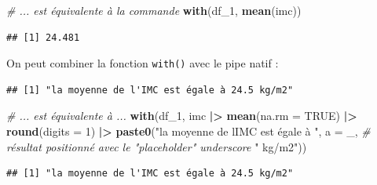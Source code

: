 \documentclass[
]{book}
\newenvironment{Shaded}{\begin{snugshade}}{\end{snugshade}}
\newcommand{\AttributeTok}[1]{\textcolor[rgb]{0.13,0.29,0.53}{#1}}
\newcommand{\CommentTok}[1]{\textcolor[rgb]{0.56,0.35,0.01}{\textit{#1}}}
\newcommand{\ConstantTok}[1]{\textcolor[rgb]{0.56,0.35,0.01}{#1}}
\newcommand{\DecValTok}[1]{\textcolor[rgb]{0.00,0.00,0.81}{#1}}
\newcommand{\FunctionTok}[1]{\textcolor[rgb]{0.13,0.29,0.53}{\textbf{#1}}}
\newcommand{\NormalTok}[1]{#1}
\newcommand{\SpecialCharTok}[1]{\textcolor[rgb]{0.81,0.36,0.00}{\textbf{#1}}}
\newcommand{\StringTok}[1]{\textcolor[rgb]{0.31,0.60,0.02}{#1}}
\begin{document}
\begin{Shaded}
\begin{Highlighting}[]
\CommentTok{\# ... est équivalente à la commande }
\FunctionTok{with}\NormalTok{(df\_1, }\FunctionTok{mean}\NormalTok{(imc))}
\end{Highlighting}
\end{Shaded}

\begin{verbatim}
## [1] 24.481
\end{verbatim}

On peut combiner la fonction \texttt{with()} avec le pipe natif :

\begin{Shaded}
\end{Shaded}

\begin{verbatim}
## [1] "la moyenne de l'IMC est égale à 24.5 kg/m2"
\end{verbatim}

\begin{Shaded}
\begin{Highlighting}[]
\CommentTok{\# ... est équivalente à ...}
\FunctionTok{with}\NormalTok{(df\_1,}
\NormalTok{     imc }\SpecialCharTok{|\textgreater{}} 
       \FunctionTok{mean}\NormalTok{(}\AttributeTok{na.rm =} \ConstantTok{TRUE}\NormalTok{) }\SpecialCharTok{|\textgreater{}}
       \FunctionTok{round}\NormalTok{(}\AttributeTok{digits =} \DecValTok{1}\NormalTok{) }\SpecialCharTok{|\textgreater{}}
       \FunctionTok{paste0}\NormalTok{(}\StringTok{"la moyenne de l\textquotesingle{}IMC est égale à "}\NormalTok{, }
              \AttributeTok{a =}\NormalTok{ \_, }\CommentTok{\# résultat positionné avec le "placeholder" underscore}
              \StringTok{" kg/m2"}\NormalTok{))}
\end{Highlighting}
\end{Shaded}

\begin{verbatim}
## [1] "la moyenne de l'IMC est égale à 24.5 kg/m2"
\end{verbatim}
\end{document}
